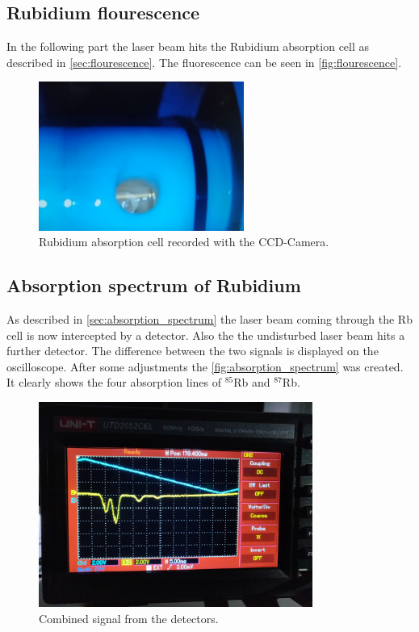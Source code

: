 \FloatBarrier

\subsection{Rubidium flourescence}
\label{sec:rubidium}

In the following part the laser beam hits the Rubidium absorption cell as described in \autoref{sec:flourescence}.
The fluorescence can be seen in \autoref{fig:flourescence}.
\begin{figure}
    \centering
    \includegraphics[width=0.6\textwidth]{content/data/flourescence_scaled.jpeg}
    \caption{Rubidium absorption cell recorded with the CCD-Camera.}
    \label{fig:flourescence}
\end{figure}
\FloatBarrier

\clearpage
\subsection{Absorption spectrum of Rubidium}
\label{sec:absorption}

As described in \autoref{sec:absorption_spectrum} the laser beam coming through the Rb cell is now intercepted by a detector.
Also the the undisturbed laser beam hits a further detector.
The difference between the two signals is displayed on the oscilloscope.
After some adjustments the \autoref{fig:absorption_spectrum} was created.
It clearly shows the four absorption lines of $^{85}$Rb and $^{87}$Rb.
\begin{figure}
    \centering
    \includegraphics[width=0.8\textwidth]{content/data/Absorption_spectrum.jpeg}
    \caption{Combined signal from the detectors.}
    \label{fig:absorption_spectrum}
\end{figure}